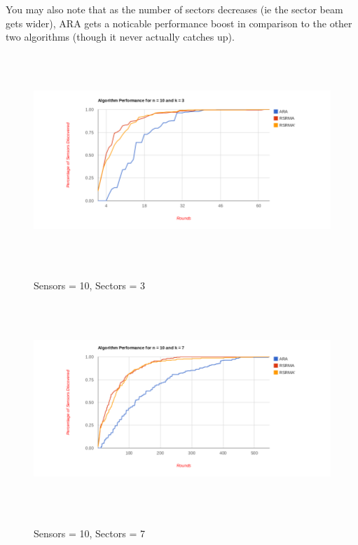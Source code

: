 You may also note that as the number of sectors decreases (ie the sector beam gets wider), ARA gets a noticable performance boost in comparison to the other two algorithms (though it never actually catches up).

\begin{figure}[ht]
\caption{Sensors = 10, Sectors = 3}
\includegraphics[height = 8cm]{pics/graph10k3.png}\\[0.5cm]    
\label{fig:n10k3}
\end{figure}

\begin{figure}[ht]
\caption{Sensors = 10, Sectors = 7}
\includegraphics[height = 8cm]{pics/graph10k7.png}\\[0.5cm]   
\label{fig:n10k7} 
\end{figure}

